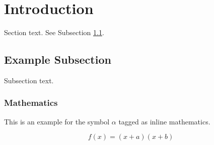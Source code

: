 \documentclass[preprint,12pt]{elsarticle}
\begin{document}


\section{Introduction}

\label{sec1}

Section text. See Subsection \ref{subsec1}.

\subsection{Example Subsection}
\label{subsec1}

Subsection text.


\subsubsection{Mathematics}
This is an example for the symbol $\alpha$ tagged as inline mathematics.

\begin{equation}
f(x) = (x+a)(x+b)
\end{equation}
\end{document}
